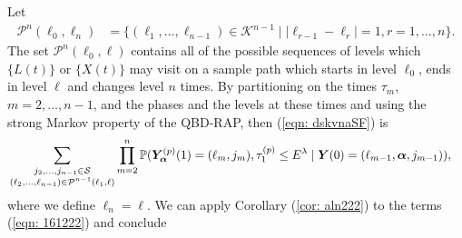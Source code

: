 Let 
\begin{align}\label{eqn: paths set1}
	\mathcal P^n(\ell_0,\ell_n)&=\{(\ell_1,\dots,\ell_{n-1}) \in \mathcal K^{n-1}\mid |\ell_{r-1}-\ell_r|=1,r = 1,\dots,n\}.
\end{align}
The set \(\mathcal P^n(\ell_0,\ell)\) contains all of the possible sequences of levels which \(\{L(t)\}\) or \(\{X(t)\}\) may visit on a sample path which starts in level \(\ell_0\), ends in level \(\ell\) and changes level \(n\) times. By partitioning on the times \(\tau_m\), \(m=2,\dots,n-1\), and the phases and the levels at these times and using the strong Markov property of the QBD-RAP, then (\ref{eqn: dskvnaSF}) is  
	\begin{align}
	 &\sum_{\substack{j_2,\dots,j_{n-1}\in\mathcal S \\ (\ell_2,\dots,\ell_{n-1}) \in\mathcal P^{n-1}(\ell_1,\ell)}}\prod_{m=2}^{n}\mathbb P(\bm{Y}_{\bm{\alpha}}^{(p)}(1) =(\ell_m, j_m), \tau_{1}^{(p)}\leq E^\lambda 
            	 \mid  
	 	\boldsymbol Y(0) = (\ell_{m-1},\boldsymbol \alpha, j_{m-1})),  \label{eqn: 161222}
\end{align}
where we define \(\ell_n=\ell\). %
We can apply Corollary (\ref{cor: aln222}) to the terms (\ref{eqn: 161222}) and conclude 
